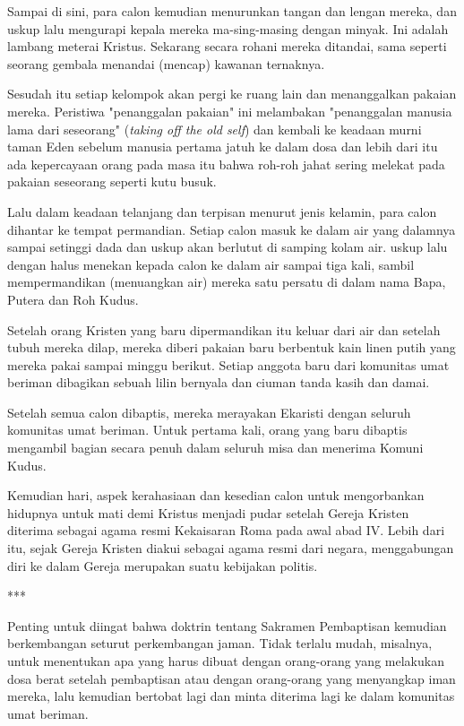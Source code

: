     Sampai di sini, para calon kemudian menurunkan tangan dan lengan mereka, dan uskup lalu mengurapi kepala mereka ma-sing-masing dengan minyak. Ini adalah lambang meterai Kristus. Sekarang secara rohani mereka ditandai, sama seperti seorang gembala menandai (mencap) kawanan ternaknya.

    Sesudah itu setiap kelompok akan pergi ke ruang lain dan menanggalkan pakaian mereka. Peristiwa "penanggalan pakaian" ini melambakan "penanggalan manusia lama dari seseorang" (\textit{taking off the old self}) dan kembali ke keadaan murni taman Eden sebelum manusia pertama jatuh ke dalam dosa dan lebih dari itu ada kepercayaan orang pada masa itu bahwa roh-roh jahat sering melekat pada pakaian seseorang seperti kutu busuk.

    Lalu dalam keadaan telanjang dan terpisan menurut jenis kelamin, para calon dihantar ke tempat permandian. Setiap calon masuk ke dalam air yang dalamnya sampai setinggi dada dan uskup akan berlutut di samping kolam air. uskup lalu dengan halus menekan kepada calon ke dalam air sampai tiga kali, sambil mempermandikan (menuangkan air) mereka satu persatu di dalam nama Bapa, Putera dan Roh Kudus.

    Setelah orang Kristen yang baru dipermandikan itu keluar dari air dan setelah tubuh mereka dilap, mereka diberi pakaian baru berbentuk kain linen putih yang mereka pakai sampai minggu berikut. Setiap anggota baru dari komunitas umat beriman dibagikan sebuah lilin bernyala dan ciuman tanda kasih dan damai.

    Setelah semua calon dibaptis, mereka merayakan Ekaristi dengan seluruh komunitas umat beriman. Untuk pertama kali, orang yang baru dibaptis mengambil bagian secara penuh dalam seluruh misa dan menerima Komuni Kudus.

    Kemudian hari, aspek kerahasiaan dan kesedian calon untuk mengorbankan hidupnya untuk mati demi Kristus menjadi pudar setelah Gereja Kristen diterima sebagai agama resmi Kekaisaran Roma pada awal abad IV. Lebih dari itu, sejak Gereja Kristen diakui sebagai agama resmi dari negara, menggabungan diri ke dalam Gereja merupakan suatu kebijakan politis.

    \begin{center}***\end{center}

    Penting untuk diingat bahwa doktrin tentang Sakramen Pembaptisan kemudian berkembangan seturut perkembangan jaman. Tidak terlalu mudah, misalnya, untuk menentukan apa yang harus dibuat dengan orang-orang yang melakukan dosa berat setelah pembaptisan atau dengan orang-orang yang menyangkap iman mereka, lalu kemudian bertobat lagi dan minta diterima lagi ke dalam komunitas umat beriman.

